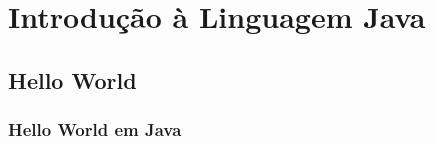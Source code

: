 \section[Introdução Java]{Introdução à Linguagem Java}

\subsection[Hello]{Hello World}

\begin{frame}[allowframebreaks]
  \frametitle{Hello World em Java}
      
  
\end{frame}
